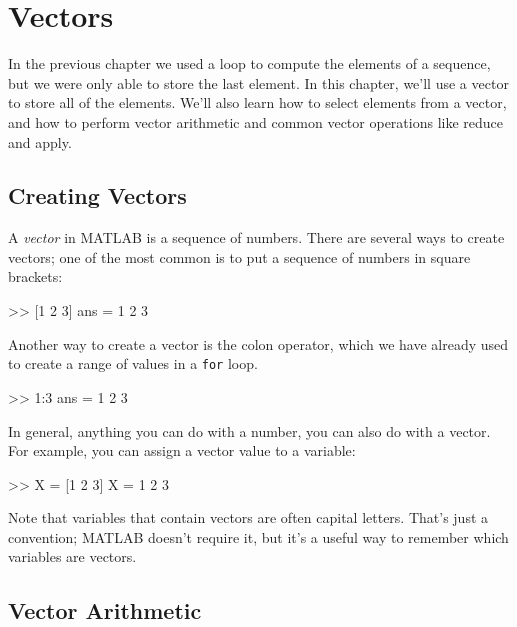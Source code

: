\chapter{Vectors}
\label{vectors}


In the previous chapter we used a loop to compute the elements of a sequence, but we were only able to store the last element.  In this chapter, we'll use a vector to store all of the elements.
We'll also learn how to select elements from a vector, and how to perform vector arithmetic and common vector operations like reduce and apply.


\section{Creating Vectors}


A \emph{vector} in MATLAB is a sequence of numbers.
There are several ways to create vectors; one of the most common is
to put a sequence of numbers in square brackets:

\begin{code}
>> [1 2 3]
ans = 1     2     3
\end{code}

Another way to create a vector is the colon operator, which we have already used to create a range of values in a \lstinline{for} loop.

\begin{code}
>> 1:3
ans = 1     2     3
\end{code}

In general, anything you can do with a number, you can also do with
a vector.  For example, you can assign a vector value to a variable:

\begin{code}
>> X = [1 2 3]
X = 1     2     3
\end{code}

Note that variables that contain vectors are often capital letters.
That's just a convention; MATLAB doesn't require it, but it's a useful way to remember which variables are vectors.


\section{Vector Arithmetic}
\label{elementwise}


